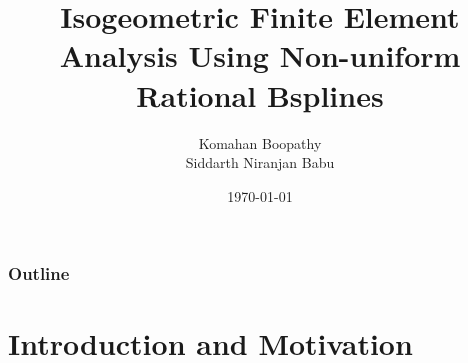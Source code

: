 \documentclass{beamer}
\title[\hspace{-0.2cm} Isogeometric Analysis Using NURBS]
{
  Isogeometric Finite Element Analysis Using Non-uniform Rational Bsplines
}
\author[ME6104 Project, K. Boopathy, S. Niranjan Babu, April 2019]
{
  \large {Komahan Boopathy}\\
  \large Siddarth Niranjan Babu \\
}
\institute
{
  \Large {\textbf{ME6104 Computer Aided Design -- Final Project}} \\
  \vspace{0.2in}
  \large Georgia Institute of Technology\\
  School of Aerospace Engineering
}
\date
{
\small \today
}
\begin{document}

\begin{frame}
  \titlepage
\end{frame}

\begin{frame}
  \frametitle{Outline}
  \tableofcontents
\end{frame}


\section{Introduction and Motivation}
\end{document}
